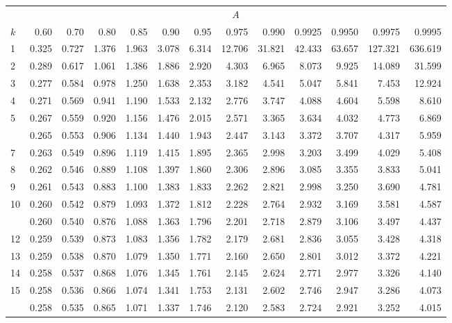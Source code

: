 \documentclass[]{article}
\begin{document}
\begin{table}[H]
\centering
\begin{tabular}{lrrrrrrrrrrrr}
\toprule
\multicolumn{1}{c}{ } & \multicolumn{12}{c}{$A$} \\
\cmidrule(l{3pt}r{3pt}){2-13}
$k$ & 0.60 & 0.70 & 0.80 & 0.85 & 0.90 & 0.95 & 0.975 & 0.990 & 0.9925 & 0.9950 & 0.9975 & 0.9995\\
\midrule
1 & 0.325 & 0.727 & 1.376 & 1.963 & 3.078 & 6.314 & 12.706 & 31.821 & 42.433 & 63.657 & 127.321 & 636.619\\
2 & 0.289 & 0.617 & 1.061 & 1.386 & 1.886 & 2.920 & 4.303 & 6.965 & 8.073 & 9.925 & 14.089 & 31.599\\
3 & 0.277 & 0.584 & 0.978 & 1.250 & 1.638 & 2.353 & 3.182 & 4.541 & 5.047 & 5.841 & 7.453 & 12.924\\
4 & 0.271 & 0.569 & 0.941 & 1.190 & 1.533 & 2.132 & 2.776 & 3.747 & 4.088 & 4.604 & 5.598 & 8.610\\
5 & 0.267 & 0.559 & 0.920 & 1.156 & 1.476 & 2.015 & 2.571 & 3.365 & 3.634 & 4.032 & 4.773 & 6.869\\
\addlinespace
6 & 0.265 & 0.553 & 0.906 & 1.134 & 1.440 & 1.943 & 2.447 & 3.143 & 3.372 & 3.707 & 4.317 & 5.959\\
7 & 0.263 & 0.549 & 0.896 & 1.119 & 1.415 & 1.895 & 2.365 & 2.998 & 3.203 & 3.499 & 4.029 & 5.408\\
8 & 0.262 & 0.546 & 0.889 & 1.108 & 1.397 & 1.860 & 2.306 & 2.896 & 3.085 & 3.355 & 3.833 & 5.041\\
9 & 0.261 & 0.543 & 0.883 & 1.100 & 1.383 & 1.833 & 2.262 & 2.821 & 2.998 & 3.250 & 3.690 & 4.781\\
10 & 0.260 & 0.542 & 0.879 & 1.093 & 1.372 & 1.812 & 2.228 & 2.764 & 2.932 & 3.169 & 3.581 & 4.587\\
\addlinespace
11 & 0.260 & 0.540 & 0.876 & 1.088 & 1.363 & 1.796 & 2.201 & 2.718 & 2.879 & 3.106 & 3.497 & 4.437\\
12 & 0.259 & 0.539 & 0.873 & 1.083 & 1.356 & 1.782 & 2.179 & 2.681 & 2.836 & 3.055 & 3.428 & 4.318\\
13 & 0.259 & 0.538 & 0.870 & 1.079 & 1.350 & 1.771 & 2.160 & 2.650 & 2.801 & 3.012 & 3.372 & 4.221\\
14 & 0.258 & 0.537 & 0.868 & 1.076 & 1.345 & 1.761 & 2.145 & 2.624 & 2.771 & 2.977 & 3.326 & 4.140\\
15 & 0.258 & 0.536 & 0.866 & 1.074 & 1.341 & 1.753 & 2.131 & 2.602 & 2.746 & 2.947 & 3.286 & 4.073\\
\addlinespace
16 & 0.258 & 0.535 & 0.865 & 1.071 & 1.337 & 1.746 & 2.120 & 2.583 & 2.724 & 2.921 & 3.252 & 4.015\\

\end{tabular}
\end{table}
\end{document}
